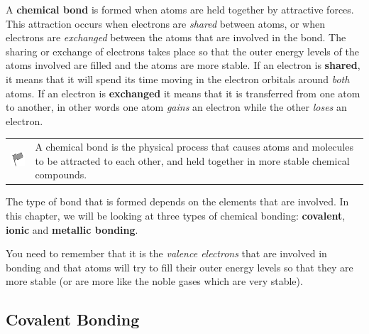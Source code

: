       
      \label{m38704*id138842}A \textbf{chemical bond} is formed when atoms are held together by attractive forces. This attraction occurs when electrons are \textsl{shared} between atoms, or when electrons are \textsl{exchanged} between the atoms that are involved in the bond. The sharing or exchange of electrons takes place so that the outer energy levels of the atoms involved are filled and the atoms are more stable. If an electron is \textbf{shared}, it means that it will spend its time moving in the electron orbitals around \textsl{both} atoms. If an electron is \textbf{exchanged} it means that it is transferred from one atom to another, in other words one atom \textsl{gains} an electron while the other \textsl{loses} an electron.\par 
\label{m38704*fhsst!!!underscore!!!id83}\begin{definition}
	  \begin{tabular*}{15 cm}{m{15 mm}m{}}
	\hspace*{-50pt}  \includegraphics[width=0.5in]{col11305.imgs/psflag2.png}   & \Definition{   \label{id2427062}\textbf{ Chemical bond }} { \label{m38704*meaningfhsst!!!underscore!!!id83}
      A chemical bond is the physical process that causes atoms and molecules to be attracted to each other, and held together in more stable chemical compounds. 
       } 
      \end{tabular*}
      \end{definition}

      \label{m38704*id138909}The type of bond that is formed depends on the elements that are involved. In this chapter, we will be looking at three types of chemical bonding: \textbf{covalent}, \textbf{ionic} and \textbf{metallic bonding}.\par 
      \label{m38704*id138929}You need to remember that it is the \textsl{valence electrons} that are involved in bonding and that atoms will try to fill their outer energy levels so that they are more stable (or are more like the noble gases which are very stable).\par 
    
    \label{m38704*cid5}
            \subsection{ Covalent Bonding}
            \nopagebreak
            \label{m38704*uid6}
